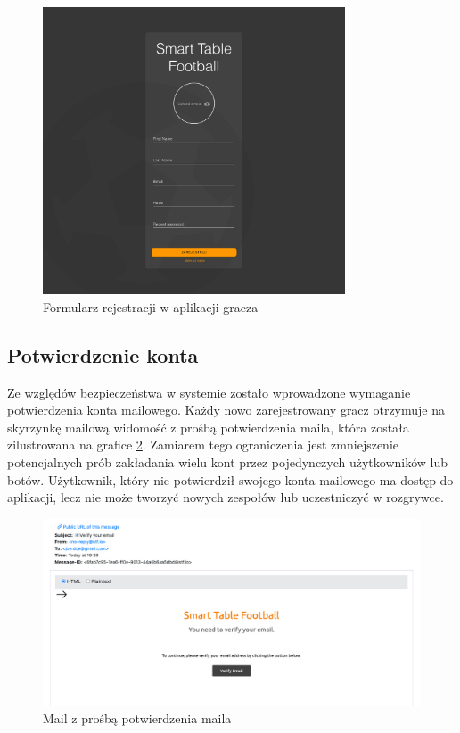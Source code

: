 \begin{figure}[h!]
  \centering
    \includegraphics[width=0.8\textwidth]{images/player/registration.png}
  \caption{Formularz rejestracji w aplikacji gracza}
  \label{fig:player-registration}
\end{figure}

\subsection{Potwierdzenie konta}

Ze względów bezpieczeństwa w systemie zostało wprowadzone wymaganie potwierdzenia konta mailowego. Każdy nowo zarejestrowany gracz otrzymuje na skyrzynkę mailową widomość z prośbą potwierdzenia maila, która została zilustrowana na grafice \ref{fig:verifyEmail}. Zamiarem tego ograniczenia jest zmniejszenie potencjalnych prób zakładania wielu kont przez pojedynczych użytkowników lub botów. Użytkownik, który nie potwierdził swojego konta mailowego ma dostęp do aplikacji, lecz nie może tworzyć nowych zespołów lub uczestniczyć w rozgrywce.

\begin{figure}[h!]
  \centering
    \includegraphics[width=\textwidth]{images/api/verify_email.png}
  \caption{Mail z prośbą potwierdzenia maila}
  \label{fig:verifyEmail}
\end{figure}

